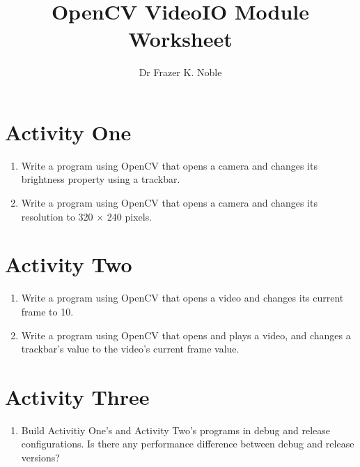 \documentclass[12pt, A4]{article}
\title{OpenCV VideoIO Module Worksheet}
\author{Dr Frazer K. Noble}
\date{}
\begin{document}
\maketitle

\section*{Activity One}

\begin{enumerate}[label=(\alph*)]

    \item Write a program using OpenCV that opens a camera and changes its brightness property using a trackbar.

    \item Write a program using OpenCV that opens a camera and changes its resolution to 320 $\times$ 240 pixels.

\end{enumerate}

\section*{Activity Two}

\begin{enumerate}[label=(\alph*)]

    \item Write a program using OpenCV that opens a video and changes its current frame to 10.

    \item Write a program using OpenCV that opens and plays a video, and changes a trackbar's value to the video's current frame value.

\end{enumerate}

\section*{Activity Three}

\begin{enumerate}[label=(\alph*)]

   \item Build Activitiy One's and Activity Two's programs in debug and release configurations. Is there any performance difference between debug and release versions?

\end{enumerate}
\end{document}
